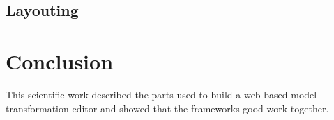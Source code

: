 \documentclass[conference,onecolumn]{IEEEtran}
\begin{document}
  \subsection{Layouting}
  \label{subsec:layouting}

 




  \section{Conclusion}
  \label{sec:conclusion}
  This scientific work described the parts used to build a web-based model transformation editor and showed that the frameworks good work together.

  \printbibliography

  
\end{document}
